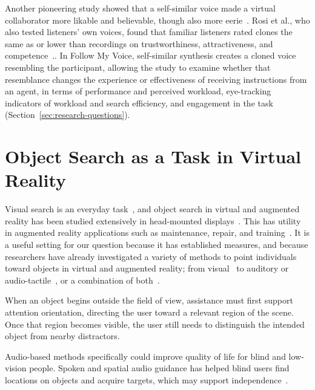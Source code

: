 Another pioneering study showed that a self-similar voice made a virtual collaborator more likable and believable, though also more eerie~\cite{guo2024doppelganger}. Rosi et al., who also tested listeners' own voices, found that familiar listeners rated clones the same as or lower than recordings on trustworthiness, attractiveness, and competence~\cite{mcgettigan2025cloned}.. In Follow My Voice, self-similar synthesis creates a cloned voice resembling the participant, allowing the study to examine whether that resemblance changes the experience or effectiveness of receiving instructions from an agent, in terms of performance and perceived workload, eye-tracking indicators of workload and search efficiency, and engagement in the task (Section~\ref{sec:research-questions}).

\section{Object Search as a Task in Virtual Reality}
Visual search is an everyday task~\cite{kelley2025cueing}, and object search in virtual and augmented reality has been studied extensively in head-mounted displays~\cite{gruenefeld2017eyesee360,trepkowski2019fov,chiossi2024searching,quinn2024review,kelley2025cueing}. This has utility in augmented reality applications such as maintenance, repair, and training~\cite{binetti2021outofview}. It is a useful setting for our question because it has established measures, and because researchers have already investigated a variety of methods to point individuals toward objects in virtual and augmented reality; from visual~\cite{grogorick2017subtle,gruenefeld2017eyesee360} to auditory or audio-tactile~\cite{marquardt2020guidance,tanaka2026coarse}, or a combination of both~\cite{binetti2021outofview,zhang2023seehear}.

When an object begins outside the field of view, assistance must first support attention orientation, directing the user toward a relevant region of the scene. Once that region becomes visible, the user still needs to distinguish the intended object from nearby distractors.

Audio-based methods specifically could improve quality of life for blind and low-vision people. Spoken and spatial audio guidance has helped blind users find locations on objects and acquire targets, which may support independence~\cite{coughlan2020spatial,tanaka2026coarse}.

